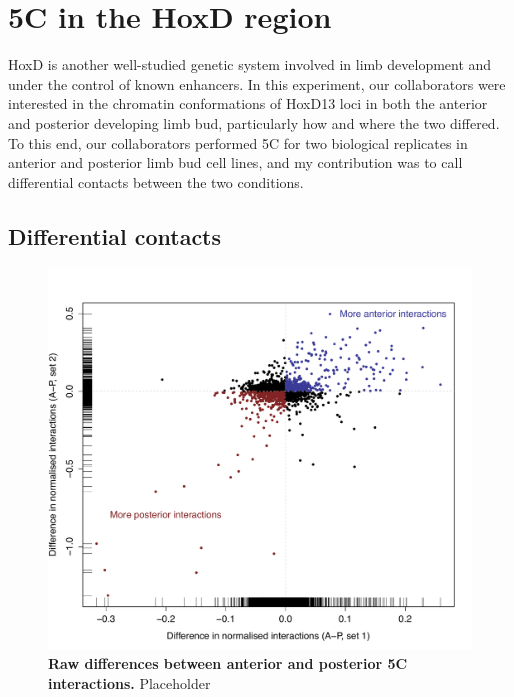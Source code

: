 \documentclass[a4paper,11pt,oneside]{book}
\begin{document}
\section{5C in the HoxD region}

HoxD is another well-studied genetic system involved in limb development and under the control of known enhancers. In this experiment, our collaborators were interested in the chromatin conformations of HoxD13 loci in both the anterior and posterior developing limb bud, particularly how and where the two differed. To this end, our collaborators performed 5C for two biological replicates in anterior and posterior limb bud cell lines, and my contribution was to call differential contacts between the two conditions.




\subsection{Differential contacts}


\begin{figure}
\begin{center} 
\includegraphics[width=\textwidth]{figs/5cfc.pdf}
\captionsetup{width=\textwidth} 
\caption[Raw differences between anterior and posterior 5C interactions.]{ {\bf Raw differences between anterior and posterior 5C interactions. }
Placeholder
}\label{fig:5cfc}
\end{center} 
\end{figure} 
\end{document}
